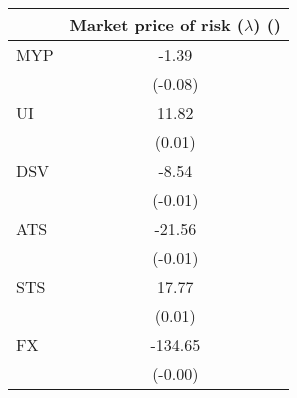 \begin{tabular}{l*{1}{c}}
\hline
\hline
& Market price of risk ($\lambda$) (\times 100)\\
\hline
MYP & -1.39\\
   & (-0.08)\\
UI & 11.82\\
   & (0.01)\\
DSV & -8.54\\
   & (-0.01)\\
ATS & -21.56\\
   & (-0.01)\\
STS & 17.77\\
   & (0.01)\\
FX & -134.65\\
   & (-0.00)\\
\hline
\hline
\end{tabular}
